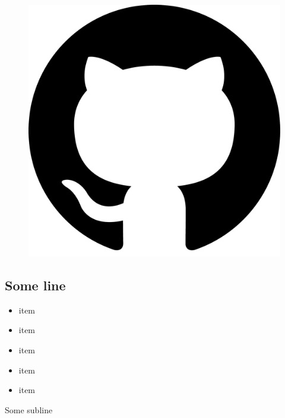 \begin{figure}[H]
\includegraphics[width=\textwidth]{./sponsors/github.pdf}
\end{figure}
\vspace{0.5cm}
\subsection*{\textbf{Some line}}

\begin{itemize}
\item  item

\item  item

\item  item

\item  item

\item  item
\end{itemize}
\noindent
Some subline

